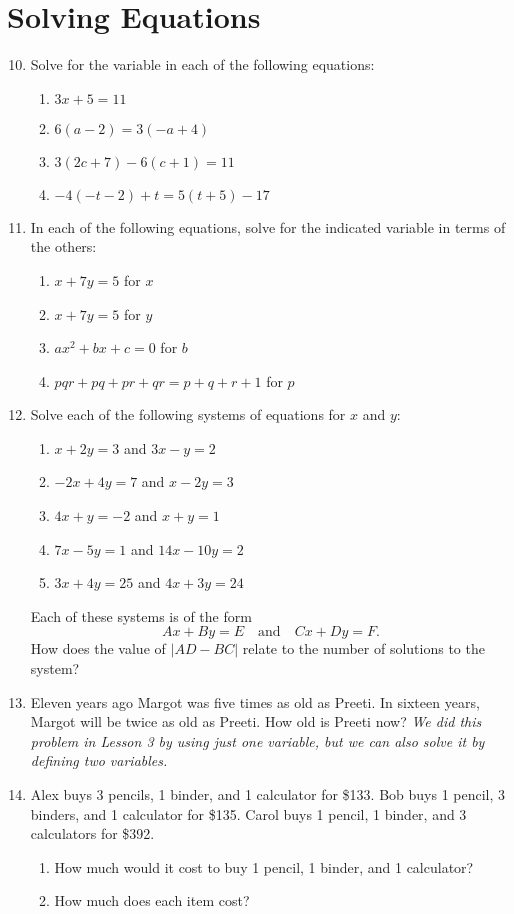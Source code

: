 \documentclass{article}
\begin{document}
\newpage
\section{Solving Equations}

\begin{enumerate}
\setcounter{enumi}{9}
\item Solve for the variable in each of the following equations:
\begin{enumerate}
\item $3x + 5 = 11$
\item $6(a - 2) = 3(-a + 4)$
\item $3(2c + 7) - 6(c + 1) = 11$
\item $-4(-t - 2) + t = 5(t + 5) - 17$
\end{enumerate}
\item In each of the following equations, solve for the indicated variable in terms of the others:
\begin{enumerate}
\item $x + 7y = 5$ for $x$
\item $x + 7y = 5$ for $y$
\item $ax^2 + bx + c = 0$ for $b$
\item $pqr + pq + pr + qr = p + q + r + 1$ for $p$
\end{enumerate}
\item Solve each of the following systems of equations for $x$ and $y$:
\begin{enumerate}
\item $x + 2y = 3$ and $3x - y = 2$
\item $-2x + 4y = 7$ and $x - 2y = 3$
\item $4x + y = -2$ and $x + y = 1$
\item $7x - 5y = 1$ and $14x - 10y = 2$
\item $3x + 4y = 25$ and $4x + 3y = 24$
\end{enumerate}
Each of these systems is of the form
\begin{equation*}
Ax + By = E\quad\text{and}\quad Cx + Dy = F.
\end{equation*}
How does the value of $\lvert AD - BC\rvert$ relate to the number of solutions to the system?
\item Eleven years ago Margot was five times as old as Preeti. In sixteen years, Margot will be twice as old as Preeti. How old is Preeti now? \textit{We did this problem in Lesson 3 by using just one variable, but we can also solve it by defining two variables.}
\item Alex buys 3 pencils, 1 binder, and 1 calculator for \$133. Bob buys 1 pencil, 3 binders, and 1 calculator for \$135. Carol buys 1 pencil, 1 binder, and 3 calculators for \$392.
\begin{enumerate}
\item How much would it cost to buy 1 pencil, 1 binder, and 1 calculator?
\item How much does each item cost?
\end{enumerate}
\end{enumerate}
\end{document}
